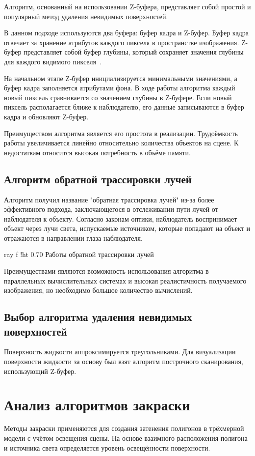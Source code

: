 Алгоритм, основанный на использовании Z-буфера, представляет собой простой и популярный метод удаления невидимых поверхностей.  

В данном подходе используются два буфера: буфер кадра и Z-буфер.  
Буфер кадра отвечает за хранение атрибутов каждого пикселя в пространстве изображения.  
Z-буфер представляет собой буфер глубины, который сохраняет значения глубины для каждого видимого пикселя~\cite{ROB}.  

На начальном этапе Z-буфер инициализируется минимальными значениями, а буфер кадра заполняется атрибутами фона.  
В ходе работы алгоритма каждый новый пиксель сравнивается со значением глубины в Z-буфере.  
Если новый пиксель располагается ближе к наблюдателю, его данные записываются в буфер кадра и обновляют Z-буфер.  

Преимуществом алгоритма является его простота в реализации.  
Трудоёмкость работы увеличивается линейно относительно количества объектов на сцене.  
К недостаткам относится высокая потребность в объёме памяти.  

\subsection{Алгоритм обратной трассировки лучей}  

Алгоритм получил название "обратная трассировка лучей" из-за более эффективного подхода, заключающегося в отслеживании пути лучей от наблюдателя к объекту.  
Согласно законам оптики, наблюдатель воспринимает объект через лучи света, испускаемые источником, которые попадают на объект и отражаются в направлении глаза наблюдателя.  


    {ray}
    {f}
    {!ht}
    {0.70\textwidth}
    {Работы обратной трассировки лучей}

Преимуществами являются возможность использования алгоритма в параллельных вычислительных системах и высокая реалистичность получаемого изображения, но необходимо большое количество вычислений.

\subsection{Выбор алгоритма удаления невидимых поверхностей}
Поверхность жидкости аппроксимируется треугольниками. 
Для визуализации поверхности жидкости за основу был взят 
алгоритм построчного сканирования, использующий Z-буфер. 

\newpage 

\section{Анализ алгоритмов закраски}
Методы закраски применяются для создания затенения полигонов в трёхмерной модели с учётом освещения сцены.  
На основе взаимного расположения полигона и источника света определяется уровень освещённости поверхности.  

